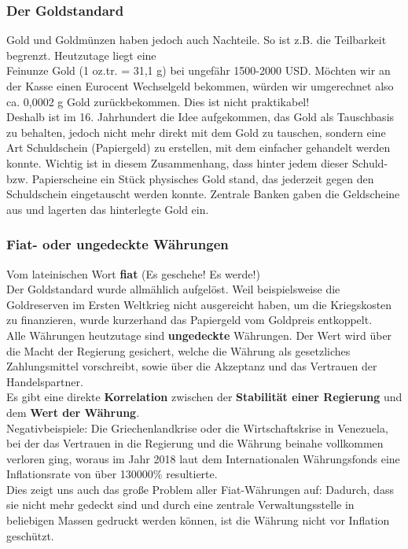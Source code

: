 \documentclass[10pt,a4paper,titlepage]{article}
\begin{document}
\subsubsection{Der Goldstandard}
Gold und Goldmünzen haben jedoch auch Nachteile. So ist z.B. die Teilbarkeit begrenzt. Heutzutage liegt eine \\Feinunze Gold (1 oz.tr. = 31,1 g) bei ungefähr 1500-2000 USD. Möchten wir an der Kasse einen
Eurocent Wechselgeld bekommen, würden wir umgerechnet also ca. 0,0002 g Gold zurückbekommen. Dies ist nicht praktikabel!\\
Deshalb ist im 16. Jahrhundert die Idee aufgekommen, das Gold als Tauschbasis zu behalten, jedoch nicht mehr direkt mit dem Gold zu tauschen, sondern eine Art Schuldschein (Papiergeld) zu erstellen, mit dem einfacher gehandelt werden konnte. Wichtig ist in diesem Zusammenhang, dass hinter jedem dieser Schuld- bzw. Papierscheine ein Stück physisches Gold stand, das jederzeit gegen den Schuldschein eingetauscht werden konnte. Zentrale Banken
gaben die Geldscheine aus und lagerten das hinterlegte Gold ein.

\subsubsection{Fiat- oder ungedeckte Währungen}
Vom lateinischen Wort \textbf{fiat} (Es geschehe! Es werde!)\\
Der Goldstandard wurde allmählich aufgelöst. Weil beispielsweise die Goldreserven im Ersten Weltkrieg nicht ausgereicht haben, um die Kriegskosten zu finanzieren, wurde kurzerhand das Papiergeld vom Goldpreis entkoppelt.\\
Alle Währungen heutzutage sind \textbf{ungedeckte} Währungen. Der Wert wird über die Macht der Regierung gesichert, welche die Währung als gesetzliches Zahlungsmittel vorschreibt, sowie über die Akzeptanz und das Vertrauen der Handelspartner.
\vspace{.3cm}\\
Es gibt eine direkte \textbf{Korrelation} zwischen der \textbf{Stabilität einer Regierung} und dem \textbf{Wert der Währung}.\\
Negativbeispiele: Die Griechenlandkrise oder die Wirtschaftskrise in Venezuela, bei der das Vertrauen in die Regierung und die Währung beinahe vollkommen verloren ging, woraus im Jahr 2018 laut dem Internationalen Währungsfonds eine Inflationsrate von über 130000\% resultierte. \vspace{.3cm}\\
Dies zeigt uns auch das große Problem aller Fiat-Währungen auf: Dadurch, dass sie nicht mehr gedeckt sind und durch eine zentrale Verwaltungsstelle in beliebigen Massen gedruckt werden können, ist die Währung nicht vor Inflation geschützt. 
\end{document}

